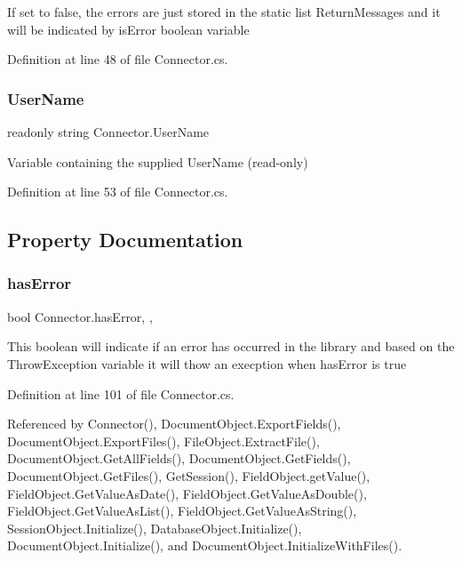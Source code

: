 If set to false, the errors are just stored in the static list Return\+Messages and it will be indicated by is\+Error boolean variable

Definition at line 48 of file Connector.\+cs.

\mbox{\label{class_connector_a41d247f09774f0ed206ce1a4a2463fed}} 
\subsubsection{\texorpdfstring{User\+Name}{UserName}}
{\footnotesize\ttfamily readonly string Connector.\+User\+Name}



Variable containing the supplied User\+Name (read-\/only) 



Definition at line 53 of file Connector.\+cs.



\subsection{Property Documentation}
\mbox{\label{class_connector_a079bae21a5417efa53bfe8954c0f533f}} 
\subsubsection{\texorpdfstring{has\+Error}{hasError}}
{\footnotesize\ttfamily bool Connector.\+has\+Error\hspace{0.3cm}{\ttfamily [static]}, {\ttfamily [get]}, {\ttfamily [set]}}



This boolean will indicate if an error has occurred in the library and based on the Throw\+Exception variable it will thow an execption when has\+Error is true 



Definition at line 101 of file Connector.\+cs.



Referenced by Connector(), Document\+Object.\+Export\+Fields(), Document\+Object.\+Export\+Files(), File\+Object.\+Extract\+File(), Document\+Object.\+Get\+All\+Fields(), Document\+Object.\+Get\+Fields(), Document\+Object.\+Get\+Files(), Get\+Session(), Field\+Object.\+get\+Value(), Field\+Object.\+Get\+Value\+As\+Date(), Field\+Object.\+Get\+Value\+As\+Double(), Field\+Object.\+Get\+Value\+As\+List(), Field\+Object.\+Get\+Value\+As\+String(), Session\+Object.\+Initialize(), Database\+Object.\+Initialize(), Document\+Object.\+Initialize(), and Document\+Object.\+Initialize\+With\+Files().


